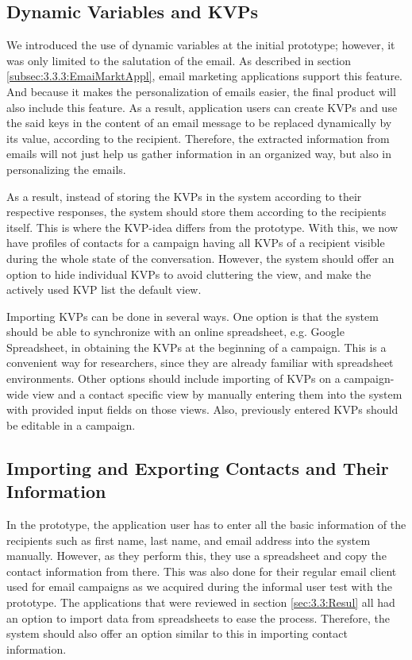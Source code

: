 \subsection{Dynamic Variables and \ac{KVP}s}
\label{subsec:5.1.2:DynmVariKVPs}
We introduced the use of dynamic variables at the initial prototype; however, it was only limited to the salutation of the email. As described in section \ref{subsec:3.3.3:EmaiMarktAppl}, email marketing applications support this feature. And because it makes the personalization of emails easier, the final product will also include this feature. As a result, application users can create \ac{KVP}s and use the said keys in the content of an email message to be replaced dynamically by its value, according to the recipient. Therefore, the extracted information from emails will not just help us gather information in an organized way, but also in personalizing the emails.
\vspace{1cm}

As a result, instead of storing the \ac{KVP}s in the system according to their respective responses, the system should store them according to the recipients itself. This is where the \ac{KVP}-idea differs from the prototype. With this, we now have profiles of contacts for a campaign having all \ac{KVP}s of a recipient visible during the whole state of the conversation. However, the system should offer an option to hide individual \ac{KVP}s to avoid cluttering the view, and make the actively used \ac{KVP} list the default view.

\vspace{1cm}
Importing \ac{KVP}s can be done in several ways. One option is that the system should be able to synchronize with an online spreadsheet, e.g. Google Spreadsheet, in obtaining the \ac{KVP}s at the beginning of a campaign. This is a convenient way for researchers, since they are already familiar with spreadsheet environments. Other options should include importing of \ac{KVP}s on a campaign-wide view and a contact specific view by manually entering them into the system with provided input fields on those views. Also, previously entered \ac{KVP}s should be editable in a campaign.

\subsection{Importing and Exporting Contacts and Their Information}
\label{subsec:5.1.3:ImpoExpoContInfo}
In the prototype, the application user has to enter all the basic information of the recipients such as first name, last name, and email address into the system manually. However, as they perform this, they use a spreadsheet and copy the contact information from there. This was also done for their regular email client used for email campaigns as we acquired during the informal user test with the prototype. The applications that were reviewed in section \ref{sec:3.3:Resul} all had an option to import data from spreadsheets to ease the process. Therefore, the system should also offer an option similar to this in importing contact information.
\vspace{1cm}

